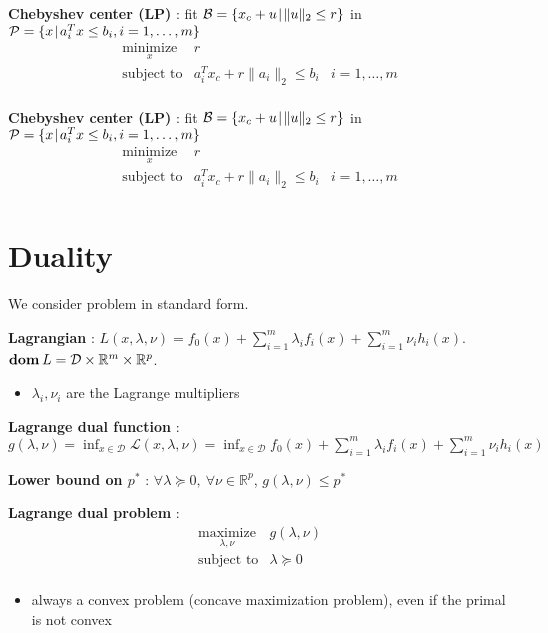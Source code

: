 \documentclass[a4paper, 10pt]{article}
\newcommand{\norm}[1]{\|#1\|}
\newcommand{\set}[2]{\{ #1 \hspace{.1em} | \hspace{.1em}#2 \}}
\newcommand{\Lag}{\mathcal{L}}
\newcommand{\R}{\mathbb{R}}
\newcommand{\dom}[1]{\textbf{dom}\hspace{0.2em}#1}
\newcommand{\itm}[1]{{\color{itmcolor} \textbf{#1}}}
\begin{document}
\begin{multicols}{2}
  \itm{Chebyshev center (LP)} : fit
  $\mathcal{B} = \set{x_c + u}{\norm{u}_2 \le r}$ in
  $\mathcal{P} = \set{x}{a_i^T x \le b_i, i=1,\dots,m}$
  \begin{equation*}
    \begin{array}{lll}
      \underset{x}{\text{minimize}} & r &\\
      \text{subject to} & a_i^T x_c + r \norm{a_i}_2 \le b_i & i = 1, \dots, m\\
    \end{array}
  \end{equation*}

  \itm{Chebyshev center (LP)} : fit
  $\mathcal{B} = \set{x_c + u}{\norm{u}_2 \le r}$ in
  $\mathcal{P} = \set{x}{a_i^T x \le b_i, i=1,\dots,m}$
  \begin{equation*}
    \begin{array}{lll}
      \underset{x}{\text{minimize}} & r &\\
      \text{subject to} & a_i^T x_c + r \norm{a_i}_2 \le b_i & i = 1, \dots, m\\
    \end{array}
  \end{equation*}

\end{multicols}

\section{Duality}

We consider problem in standard form.

\itm{Lagrangian} : $L(x, \lambda, \nu) = f_0(x) + \sum_{i = 1}^m \lambda_i f_i(x) + \sum_{i = 1}^m \nu_i h_i(x)$. $\dom{L} = \mathcal{D} \times \R^m \times \R^p$.
\begin{itemize}
\item  $\lambda_i, \nu_i$ are the Lagrange multipliers
\end{itemize}

\itm{Lagrange dual function} : $g(\lambda, \nu) = \inf_{x \in \mathcal{D}} \Lag(x, \lambda, \nu) = \inf_{x \in \mathcal{D}} f_0(x) + \sum_{i = 1}^m \lambda_i f_i(x) + \sum_{i = 1}^m \nu_i h_i(x)$

\itm{Lower bound on $p^*$} : $\forall \lambda \succeq 0,\ \forall \nu \in \R^p$, $g(\lambda, \nu) \le p^*$

\itm{Lagrange dual problem} :
\begin{equation*}
  \begin{array}{lll}
    \underset{\lambda, \nu}{\text{maximize}} & g(\lambda, \nu) \\
    \text{subject to} & \lambda \succeq 0 \\
  \end{array}
\end{equation*}
\begin{itemize}
\item always a convex problem (concave maximization problem), even if
  the primal is not convex
\end{itemize}
\end{document}
